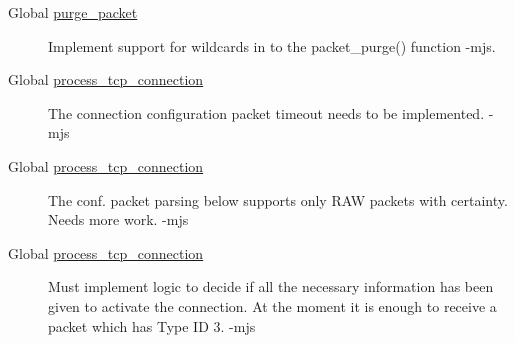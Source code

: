 \label{todo__todo000015}
\hypertarget{todo__todo000015}{}
 \begin{description}
\item[Global \hyperlink{serialserver_8h_d1906dfda0437f68ccc02e98ec91b6d9}{purge\_\-packet} ]Implement support for wildcards in to the packet\_\-purge() function -mjs. 
\end{description}


\label{todo__todo000017}
\hypertarget{todo__todo000017}{}
 \begin{description}
\item[Global \hyperlink{tcpserver_8c_0eb8fdec50bfdfa77f5dca2e40ba7f99}{process\_\-tcp\_\-connection} ]The connection configuration packet timeout needs to be implemented. -mjs \end{description}


\label{todo__todo000017}
\hypertarget{todo__todo000017}{}
 \begin{description}
\item[Global \hyperlink{tcpserver_8c_0eb8fdec50bfdfa77f5dca2e40ba7f99}{process\_\-tcp\_\-connection} ]The conf. packet parsing below supports only RAW packets with certainty. Needs more work. -mjs \end{description}


\label{todo__todo000017}
\hypertarget{todo__todo000017}{}
 \begin{description}
\item[Global \hyperlink{tcpserver_8c_0eb8fdec50bfdfa77f5dca2e40ba7f99}{process\_\-tcp\_\-connection} ]Must implement logic to decide if all the necessary information has been given to activate the connection. At the moment it is enough to receive a packet which has Type ID 3. -mjs \end{description}


